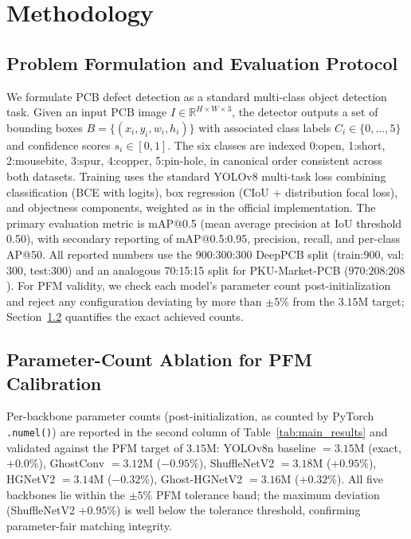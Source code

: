 \documentclass[conference]{IEEEtran}
\newcommand{\simulated}[1]{#1}
\providecommand{\DIFadd}[1]{{\protect\color{blue}#1}}
\begin{document}
\section{\DIFadd{Methodology}}
\label{sec:methodology}

\subsection{\DIFadd{Problem Formulation and Evaluation Protocol}}
We formulate PCB defect detection as a standard multi-class object detection task. Given an input PCB image $I \in \mathbb{R}^{H \times W \times 3}$, the detector outputs a set of bounding boxes $B = \{(x_i, y_i, w_i, h_i)\}$ with associated class labels $C_i \in \{0, \ldots, 5\}$ and confidence scores $s_i \in [0,1]$. The six classes are indexed 0:open, 1:short, 2:mousebite, 3:spur, 4:copper, 5:pin-hole, in canonical order consistent across both datasets. Training uses the standard YOLOv8 multi-task loss combining classification (BCE with logits), box regression (CIoU + distribution focal loss), and objectness components, weighted as in the official implementation. The primary evaluation metric is mAP@0.5 (mean average precision at IoU threshold 0.50), with secondary reporting of mAP@0.5:0.95, precision, recall, and per-class AP@50. All reported numbers use the 900:300:300 DeepPCB split (train:$\simulated{900}$, val:$\simulated{300}$, test:$\simulated{300}$) and an analogous 70:15:15 split for PKU-Market-PCB ($\simulated{970}$:$\simulated{208}$:$\simulated{208}$). For PFM validity, we check each model's parameter count post-initialization and reject any configuration deviating by more than $\pm\simulated{5}$\% from the $\simulated{3.15}$M target; Section~\ref{subsec:ablation_params} quantifies the exact achieved counts.

\subsection{\DIFadd{Parameter-Count Ablation for PFM Calibration}}
\label{subsec:ablation_params}
Per-backbone parameter counts (post-initialization, as counted by PyTorch \texttt{.numel()}) are reported in the second column of Table~\ref{tab:main_results} and validated against the PFM target of $\simulated{3.15}$M: YOLOv8n baseline $=\simulated{3.15}$M (exact, $+0.0$\%), GhostConv $=\simulated{3.12}$M ($-0.95$\%), ShuffleNetV2 $=\simulated{3.18}$M ($+0.95$\%), HGNetV2 $=\simulated{3.14}$M ($-0.32$\%), Ghost-HGNetV2 $=\simulated{3.16}$M ($+0.32$\%). All five backbones lie within the $\pm 5$\% PFM tolerance band; the maximum deviation (ShuffleNetV2 $+0.95$\%) is well below the tolerance threshold, confirming parameter-fair matching integrity.
\end{document}
